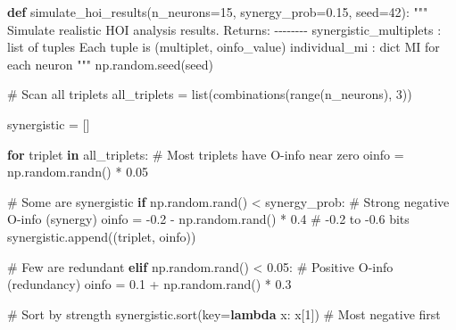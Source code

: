 \documentclass[
  11pt,
  letterpaper,
  oneside,
  openany]{book}
\newenvironment{Shaded}{\begin{snugshade}}{\end{snugshade}}
\newcommand{\BuiltInTok}[1]{\textcolor[rgb]{0.00,0.23,0.31}{#1}}
\newcommand{\CommentTok}[1]{\textcolor[rgb]{0.37,0.37,0.37}{#1}}
\newcommand{\ControlFlowTok}[1]{\textcolor[rgb]{0.00,0.23,0.31}{\textbf{#1}}}
\newcommand{\DecValTok}[1]{\textcolor[rgb]{0.68,0.00,0.00}{#1}}
\newcommand{\FloatTok}[1]{\textcolor[rgb]{0.68,0.00,0.00}{#1}}
\newcommand{\KeywordTok}[1]{\textcolor[rgb]{0.00,0.23,0.31}{\textbf{#1}}}
\newcommand{\NormalTok}[1]{\textcolor[rgb]{0.00,0.23,0.31}{#1}}
\newcommand{\OperatorTok}[1]{\textcolor[rgb]{0.37,0.37,0.37}{#1}}
\begin{document}
\begin{Shaded}
\begin{Highlighting}[]
\KeywordTok{def}\NormalTok{ simulate\_hoi\_results(n\_neurons}\OperatorTok{=}\DecValTok{15}\NormalTok{, synergy\_prob}\OperatorTok{=}\FloatTok{0.15}\NormalTok{, seed}\OperatorTok{=}\DecValTok{42}\NormalTok{):}
    \CommentTok{"""}
\CommentTok{    Simulate realistic HOI analysis results.}
\CommentTok{    }
\CommentTok{    Returns:}
\CommentTok{    {-}{-}{-}{-}{-}{-}{-}{-}}
\CommentTok{    synergistic\_multiplets : list of tuples}
\CommentTok{        Each tuple is (multiplet, oinfo\_value)}
\CommentTok{    individual\_mi : dict}
\CommentTok{        MI for each neuron}
\CommentTok{    """}
\NormalTok{    np.random.seed(seed)}
    
    \CommentTok{\# Scan all triplets}
\NormalTok{    all\_triplets }\OperatorTok{=} \BuiltInTok{list}\NormalTok{(combinations(}\BuiltInTok{range}\NormalTok{(n\_neurons), }\DecValTok{3}\NormalTok{))}
    
\NormalTok{    synergistic }\OperatorTok{=}\NormalTok{ []}
    
    \ControlFlowTok{for}\NormalTok{ triplet }\KeywordTok{in}\NormalTok{ all\_triplets:}
        \CommentTok{\# Most triplets have O{-}info near zero}
\NormalTok{        oinfo }\OperatorTok{=}\NormalTok{ np.random.randn() }\OperatorTok{*} \FloatTok{0.05}
        
        \CommentTok{\# Some are synergistic}
        \ControlFlowTok{if}\NormalTok{ np.random.rand() }\OperatorTok{\textless{}}\NormalTok{ synergy\_prob:}
            \CommentTok{\# Strong negative O{-}info (synergy)}
\NormalTok{            oinfo }\OperatorTok{=} \OperatorTok{{-}}\FloatTok{0.2} \OperatorTok{{-}}\NormalTok{ np.random.rand() }\OperatorTok{*} \FloatTok{0.4}  \CommentTok{\# {-}0.2 to {-}0.6 bits}
\NormalTok{            synergistic.append((triplet, oinfo))}
        
        \CommentTok{\# Few are redundant}
        \ControlFlowTok{elif}\NormalTok{ np.random.rand() }\OperatorTok{\textless{}} \FloatTok{0.05}\NormalTok{:}
            \CommentTok{\# Positive O{-}info (redundancy)}
\NormalTok{            oinfo }\OperatorTok{=} \FloatTok{0.1} \OperatorTok{+}\NormalTok{ np.random.rand() }\OperatorTok{*} \FloatTok{0.3}
    
    \CommentTok{\# Sort by strength}
\NormalTok{    synergistic.sort(key}\OperatorTok{=}\KeywordTok{lambda}\NormalTok{ x: x[}\DecValTok{1}\NormalTok{])  }\CommentTok{\# Most negative first}
    

\end{Highlighting}
\end{Shaded}
\end{document}
